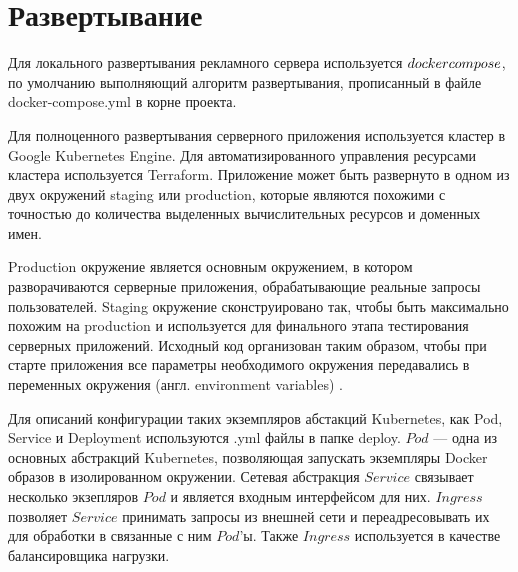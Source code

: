 \documentclass[specification,annotation,times]{itmo-student-thesis}
\begin{document}














\section{Развертывание}

Для локального развертывания рекламного сервера используется $docker\-compose$, по умолчанию выполняющий алгоритм развертывания, прописанный в файле docker-compose.yml в корне проекта.

Для полноценного развертывания серверного приложения используется кластер в Google Kubernetes Engine. Для автоматизированного управления ресурсами кластера используется Terraform. Приложение может быть развернуто в одном из двух окружений staging или production, которые являются похожими с точностью до количества выделенных вычислительных ресурсов и доменных имен.

Production окружение является основным окружением, в котором разворачиваются серверные приложения, обрабатывающие реальные запросы пользователей. Staging окружение сконструировано так, чтобы быть максимально похожим на production и используется для финального этапа тестирования серверных приложений. Исходный код организован таким образом, чтобы при старте приложения все параметры необходимого окружения передавались в переменных окружения (англ. environment variables) \cite{twelve-factor-app}.

Для описаний конфигурации таких экземпляров абстакций Kubernetes, как Pod, Service и Deployment используются .yml файлы в папке deploy. $Pod$ — одна из основных абстракций Kubernetes, позволяющая запускать экземпляры Docker образов в изолированном окружении. Сетевая абстракция $Service$ связывает несколько экзепляров $Pod$ и является входным интерфейсом для них. $Ingress$ позволяет $Service$ принимать запросы из внешней сети и переадресовывать их для обработки в связанные с ним $Pod$'ы. Также $Ingress$  используется в качестве балансировщика нагрузки.
\end{document}
